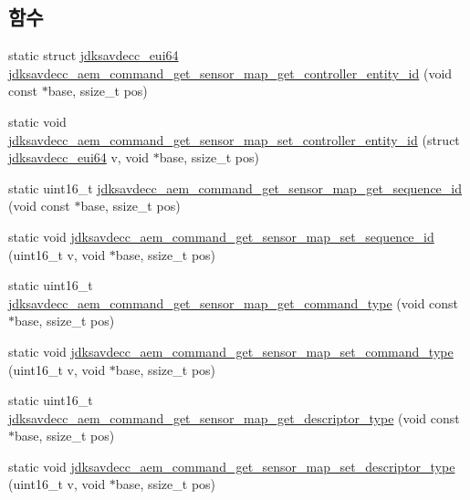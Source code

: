 \subsection*{함수}
\begin{DoxyCompactItemize}
\item 
static struct \hyperlink{structjdksavdecc__eui64}{jdksavdecc\+\_\+eui64} \hyperlink{group__command__get__sensor__map_gaec1508a93b57a9b5f0b57fc4a241ec33}{jdksavdecc\+\_\+aem\+\_\+command\+\_\+get\+\_\+sensor\+\_\+map\+\_\+get\+\_\+controller\+\_\+entity\+\_\+id} (void const $\ast$base, ssize\+\_\+t pos)
\item 
static void \hyperlink{group__command__get__sensor__map_ga9c85fa3a10f9ee9b40f199c75feadf05}{jdksavdecc\+\_\+aem\+\_\+command\+\_\+get\+\_\+sensor\+\_\+map\+\_\+set\+\_\+controller\+\_\+entity\+\_\+id} (struct \hyperlink{structjdksavdecc__eui64}{jdksavdecc\+\_\+eui64} v, void $\ast$base, ssize\+\_\+t pos)
\item 
static uint16\+\_\+t \hyperlink{group__command__get__sensor__map_ga8be92a283d00b7869496938315772df1}{jdksavdecc\+\_\+aem\+\_\+command\+\_\+get\+\_\+sensor\+\_\+map\+\_\+get\+\_\+sequence\+\_\+id} (void const $\ast$base, ssize\+\_\+t pos)
\item 
static void \hyperlink{group__command__get__sensor__map_gaeaf2e0558bceb9dc32e31c76f840b276}{jdksavdecc\+\_\+aem\+\_\+command\+\_\+get\+\_\+sensor\+\_\+map\+\_\+set\+\_\+sequence\+\_\+id} (uint16\+\_\+t v, void $\ast$base, ssize\+\_\+t pos)
\item 
static uint16\+\_\+t \hyperlink{group__command__get__sensor__map_ga2a9340bac7dfedbbb5311dcf16b219e4}{jdksavdecc\+\_\+aem\+\_\+command\+\_\+get\+\_\+sensor\+\_\+map\+\_\+get\+\_\+command\+\_\+type} (void const $\ast$base, ssize\+\_\+t pos)
\item 
static void \hyperlink{group__command__get__sensor__map_ga82a42d5c89c64642c39fdea9630d9a5f}{jdksavdecc\+\_\+aem\+\_\+command\+\_\+get\+\_\+sensor\+\_\+map\+\_\+set\+\_\+command\+\_\+type} (uint16\+\_\+t v, void $\ast$base, ssize\+\_\+t pos)
\item 
static uint16\+\_\+t \hyperlink{group__command__get__sensor__map_ga8b675a55281a4c1554b1a019ca305603}{jdksavdecc\+\_\+aem\+\_\+command\+\_\+get\+\_\+sensor\+\_\+map\+\_\+get\+\_\+descriptor\+\_\+type} (void const $\ast$base, ssize\+\_\+t pos)
\item 
static void \hyperlink{group__command__get__sensor__map_ga5f1c64dbe865a4f9e798077894c5fd6c}{jdksavdecc\+\_\+aem\+\_\+command\+\_\+get\+\_\+sensor\+\_\+map\+\_\+set\+\_\+descriptor\+\_\+type} (uint16\+\_\+t v, void $\ast$base, ssize\+\_\+t pos)

\end{DoxyCompactItemize}
